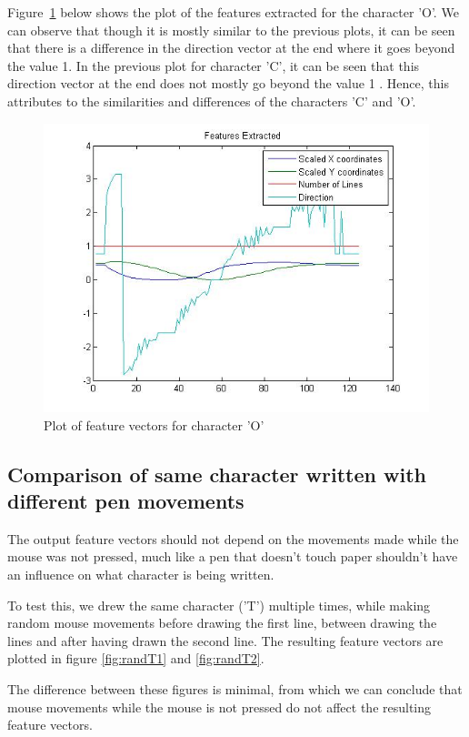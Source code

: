 Figure~\ref{fig:o} below shows the plot of the features extracted for the character 'O'. We can observe that though it is mostly similar to the previous plots, it can be seen that there is a difference in the direction vector at the end where it goes beyond the value 1. In the previous plot for character 'C', it can be seen that this direction vector at the end does not mostly go beyond the value 1 . Hence, this attributes to the similarities and differences of the characters 'C' and 'O'.

\begin{figure}[H]
	\centering
	\includegraphics[width=.7\linewidth]{images/deepas/O}
	\caption{Plot of feature vectors for character 'O'}
	\label{fig:o}
\end{figure}

\subsection{Comparison of same character written with different pen movements}
The output feature vectors should not depend on the movements made while the mouse was not pressed, much like a pen that doesn't touch paper shouldn't have an influence on what character is being written.

To test this, we drew the same character ('T') multiple times, while making random mouse movements before drawing the first line, between drawing the lines and after having drawn the second line. The resulting feature vectors are plotted in figure \ref{fig:randT1} and \ref{fig:randT2}.

The difference between these figures is minimal, from which we can conclude that mouse movements while the mouse is not pressed do not affect the resulting feature vectors.

